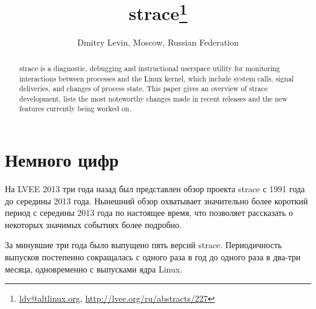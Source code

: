 \documentclass[10pt, a5paper]{article}
\begin{document}
\title{strace\footnote{\url{ldv@altlinux.org}, \url{http://lvee.org/ru/abstracts/227}}}
\author{Dmitry Levin, Moscow, Russian Federation}
\maketitle
\begin{abstract}
strace is a diagnostic, debugging and instructional userspace utility for monitoring interactions between processes and the Linux kernel, which include system calls, signal deliveries, and changes of process state. This paper gives an overview of strace development, lists the most noteworthy changes made in recent releases and the new features currently being worked on.
\end{abstract}

\section*{Немного цифр}

На LVEE 2013 три года назад был представлен обзор проекта strace с 1991 года
до середины 2013 года\cite{lvee2013}. Нынешний обзор охватывает значительно более короткий период с середины 2013 года по настоящее время, что позволяет рассказать о некоторых значимых событиях более подробно.

За минувшие три года было выпущено пять версий strace.
Периодичность выпусков постепенно сокращалась с одного раза в год
до одного раза в два-три месяца, одновременно с выпусками ядра Linux.
\end{document}
